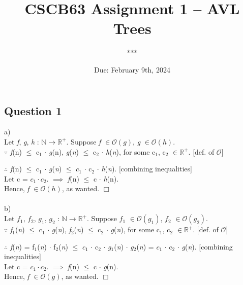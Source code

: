 \documentclass[fleqn]{article}
\title{CSCB63 Assignment 1 -- AVL Trees}
\author{***}
\date{Due: February 9th, 2024}
\newcommand{\bigo}[1]{\mathcal{O}(#1)}
\newcommand{\ital}{\itshape{}}
\begin{document}
\maketitle

\subsection*{Question 1}

a) \\ 
Let {\itshape f}, {\itshape g}, {\itshape h} : $\mathbb{N} \rightarrow \mathbb{R^+}$.
Suppose {\itshape f} $\in \bigo{g}$, {\itshape g} $\in \bigo{h}$. \\

\noindent $\because$ 
{\itshape f}(n) $\leq$ c$_{1}$ $\cdot$ {\itshape g}(n),
{\itshape g}({\itshape n}) $\leq$ c$_{2}$ $\cdot$ {\ital h}({\itshape n}), 
for some c$_{1}$, c$_{2}$ $\in \mathbb{R^{+}}$. [def. of $\mathcal{O}$]

\noindent $\therefore$
{\ital f}(n) $\leq$ c$_1$ 
$\cdot$ {\ital g}({\ital n}) $\leq$ $c_1$ $\cdot$ c$_2$ $\cdot$ {\ital h}({\ital n}).
[combining inequalities] \\

\noindent
Let c = $c_1 \cdot c_2$. 
$\implies$ {\ital f}(n) $\leq$ c $\cdot$ {\ital h}(n). \\
Hence, {\ital f} $\in \bigo{h}$, as wanted. $\Box$ \\ \\

\noindent
b) \\
Let {\itshape $f_1$}, {\itshape $f_2$}, {\itshape $g_1$}, {\itshape $g_2$} : 
$\mathbb{N} \rightarrow \mathbb{R^+}$.
Suppose {\itshape $f_1$} $\in \bigo{g_1}$, {\itshape $f_2$} $\in \bigo{g_2}$. \\

\noindent $\because$ 
{\itshape f$_1$}({\ital n}) $\leq$ c$_{1}$ $\cdot$ {\itshape g}({\ital n}),
{\itshape f$_2$}({\ital n}) $\leq$ c$_{2}$ $\cdot$ {\itshape g}({\ital n}),
for some c$_{1}$, c$_{2}$ $\in \mathbb{R^{+}}$. [def. of $\mathcal{O}$]

\noindent $\therefore$
{\ital f}({\ital n}) = f$_{1}$({\ital n}) $\cdot$ f$_{2}$({\ital n}) $\leq$
$c_1$ $\cdot$ c$_2$ $\cdot$ {\ital g$_1$}({\ital n}) $\cdot$ {\ital g$_2$}({\ital n}) =
$c_1$ $\cdot$ c$_2$ $\cdot$ {\ital g}({\ital n}).
[combining inequalities] \\

\noindent
Let c = $c_1 \cdot c_2$. 
$\implies$ {\ital f}(n) $\leq$ c $\cdot$ {\ital g}(n). \\
Hence, {\ital f} $\in \bigo{g}$, as wanted. $\Box$ \\ \\
\end{document}
